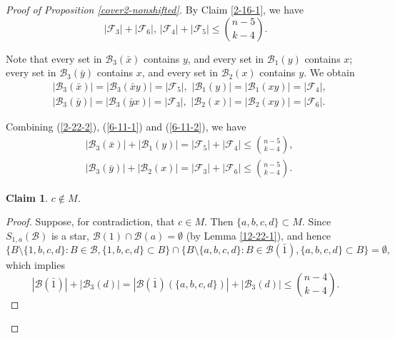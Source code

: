 \documentclass[a4paper,11pt]{article}
\newtheorem{claim}[theorem]{Claim}
\newcommand{\m}{\mathcal}
\begin{document}
\begin{proof}[Proof of Proposition \ref{cover2-nonshifted}]
By Claim \ref{2-16-1}, we have 
\begin{equation}\label{2-22-2}
|\m F_3|+|\m F_6|, \, |\m F_4|+|\m F_5| \le {n-5\choose k-4}.
\end{equation}

Note that every set in $\m B_3(\bar{x})$ contains $y$, and every set in $\m B_1(y)$ contains $x$; every set in $\m B_3(\bar{y})$ contains $x$, and every set in $\m B_2(x)$ contains $y$. We obtain
\begin{align}\label{6-11-1}
&|\m B_3(\bar{x})|=|\m B_3(\bar{x}y)|=|\m F_5|,\,\, |\m B_1(y)|=|\m B_1(xy)|=|\m F_4|,\\ \label{6-11-2}
&|\m B_3(\bar{y})|=|\m B_3(\bar{y}x)|=|\m F_3|,\,\, |\m B_2(x)|=|\m B_2(xy)|=|\m F_6|.
\end{align}

Combining (\ref{2-22-2}), (\ref{6-11-1}) and (\ref{6-11-2}), we have
\begin{align}\label{6-7}
&|\m B_3(\bar{x})|+|\m B_1(y)|=|\m F_5|+|\m F_4|\le {n-5\choose k-4},\\ \label{6-11-3}
&|\m B_3(\bar{y})|+|\m B_2(x)|=|\m F_3|+|\m F_6|\le {n-5\choose k-4}.
\end{align}

\begin{claim}\label{cnotinm}
 $c\not\in M$.
\end{claim}

\begin{proof}
Suppose, for contradiction, that $c\in M$. Then $\{a,b,c,d\}\subset M$. 
Since $S_{1,a}(\m B)$ is a star, $\m B(1)\cap \m B(a)=\emptyset$ (by Lemma \ref{12-22-1}), and hence 
\[
\{B\setminus \{1,b,c,d\}: B\in \m B, \{1,b,c,d\}\subset B\}\cap \{B\setminus \{a,b,c,d\}: B\in \m B(\bar1), \{a,b,c,d\}\subset B\}=\emptyset,
\]
which implies
\begin{equation}\label{6-6}
    |\m B(\bar{1})|+|\m B_3(d)|=|\m B(\bar{1})(\{a,b,c,d\})|+|\m B_3(d)| \le {n-4\choose k-4}.
\end{equation}



\end{proof}
\end{proof}
\end{document}
